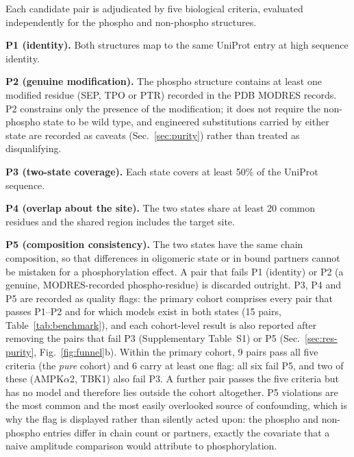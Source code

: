 Each candidate pair is adjudicated by five biological criteria, evaluated
independently for the phospho and non-phospho structures.

\noindent\textbf{P1 (identity).} Both structures map to the same UniProt
entry at high sequence identity.

\noindent\textbf{P2 (genuine modification).} The phospho structure contains
at least one modified residue (SEP, TPO or PTR) recorded in the PDB MODRES
records. P2 constrains only the presence of the modification; it does not
require the non-phospho state to be wild type, and engineered substitutions
carried by either state are recorded as caveats
(Sec.~\ref{sec:purity}) rather than treated as disqualifying.

\noindent\textbf{P3 (two-state coverage).} Each state covers at least 50\%
of the UniProt sequence.

\noindent\textbf{P4 (overlap about the site).} The two states share at
least 20 common residues and the shared region includes the target site.

\noindent\textbf{P5 (composition consistency).} The two states have the
same chain composition, so that differences in oligomeric state or in
bound partners cannot be mistaken for a phosphorylation effect.
A pair that fails P1 (identity) or P2 (a genuine, MODRES-recorded
phospho-residue) is discarded outright. P3, P4 and P5 are recorded as
quality flags: the primary cohort comprises every pair that passes P1--P2
and for which models exist in both states (15 pairs,
Table~\ref{tab:benchmark}), and each cohort-level result is also reported
after removing the pairs that fail P3 (Supplementary Table~S1) or P5
(Sec.~\ref{sec:res-purity}, Fig.~\ref{fig:funnel}b). Within
the primary cohort, 9 pairs pass all five criteria (the \emph{pure} cohort)
and 6 carry at least one flag: all six fail P5, and two of these
(AMPK$\alpha$2, TBK1) also fail P3. A further pair passes the five criteria
but has no model and therefore lies outside the cohort altogether.
P5 violations are the most common and the most easily
overlooked source of confounding, which is why the flag is displayed rather
than silently acted upon: the phospho and non-phospho entries differ in
chain count or partners, exactly the covariate that a naive amplitude
comparison would attribute to phosphorylation.

